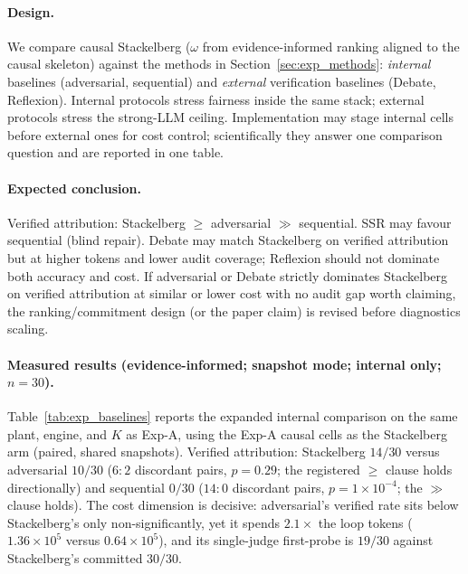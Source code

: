 \documentclass[a4paper,fleqn]{cas-sc}
\begin{document}
\paragraph{Design.}
We compare causal Stackelberg ($\omega$ from evidence-informed ranking aligned
to the causal skeleton) against the methods in Section~\ref{sec:exp_methods}:
\emph{internal} baselines (adversarial, sequential) and \emph{external}
verification baselines (Debate, Reflexion). Internal protocols stress fairness
inside the same stack; external protocols stress the strong-LLM ceiling.
Implementation may stage internal cells before external ones for cost control;
scientifically they answer one comparison question and are reported in one
table.

\paragraph{Expected conclusion.}
Verified attribution: Stackelberg $\geq$ adversarial $\gg$ sequential.
SSR may favour sequential (blind repair). Debate may match Stackelberg on
verified attribution but at higher tokens and lower audit coverage; Reflexion
should not dominate both accuracy and cost. If adversarial or Debate strictly
dominates Stackelberg on verified attribution at similar or lower cost with no
audit gap worth claiming, the ranking/commitment design (or the paper claim)
is revised before diagnostics scaling.

\paragraph{Measured results (evidence-informed; snapshot mode; internal only; $n{=}30$).}
Table~\ref{tab:exp_baselines} reports the expanded internal comparison on
the same plant, engine, and $K$ as Exp-A, using the Exp-A causal cells as
the Stackelberg arm (paired, shared snapshots). Verified attribution:
Stackelberg $14/30$ versus adversarial $10/30$ ($6{:}2$ discordant pairs,
$p=0.29$; the registered $\geq$ clause holds directionally) and sequential
$0/30$ ($14{:}0$ discordant pairs, $p=1\times10^{-4}$; the $\gg$ clause
holds). The cost dimension is decisive: adversarial's verified rate sits
below Stackelberg's only non-significantly, yet it spends $2.1\times$ the
loop tokens ($1.36{\times}10^{5}$ versus $0.64{\times}10^{5}$), and its
single-judge first-probe is $19/30$ against Stackelberg's committed
$30/30$.
\end{document}
